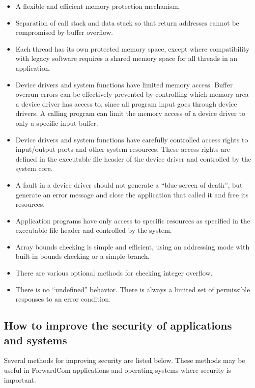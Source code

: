 \documentclass[forwardcom.tex]{subfiles}
\begin{document}
\begin{itemize}
\item A flexible and efficient memory protection mechanism.

\item Separation of call stack and data stack so that return addresses cannot be compromised by buffer overflow.

\item Each thread has its own protected memory space, except where compatibility with legacy 
software requires a shared memory space for all threads in an application.

\item Device drivers and system functions have limited memory access. 
Buffer overrun errors can be effectively prevented by controlling which memory area a device driver has access to, since all program input goes through device drivers. A calling program can limit the memory access of a device driver to only a specific input buffer.

\item Device drivers and system functions have carefully controlled access rights to input/output ports and other system resources. These access rights are defined in the executable file header of the device driver and controlled by the system core.

\item A fault in a device driver should not generate a ``blue screen of death'', but generate an error message and close the application that called it and free its resources.

\item Application programs have only access to specific resources as specified in the executable file header and controlled by the system.

\item Array bounds checking is simple and efficient, using an addressing mode with built-in bounds checking or a simple branch.

\item There are various optional methods for checking integer overflow.

\item There is no ``undefined'' behavior. There is always a limited set of permissible responses to an error condition.
\end{itemize}

\subsection{How to improve the security of applications and systems}
Several methods for improving security are listed below. These methods may be useful in ForwardCom applications and operating systems where security is important.
\end{document}
